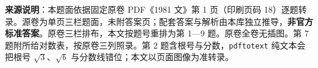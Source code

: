 


\begin{gktip}
\textbf{来源说明}：本题面依据固定原卷 PDF《1981 文》第 1 页（印刷页码 18）逐题转录。源卷为单页三栏题面，未附答案页；配套答案与解析由本库独立推导，\textbf{非官方标准答案}。原卷三栏排布，本文按题号重排为第 1—9 题。原卷全卷无插图。第 7 题附所给对数表，按原卷三列照录。第 2 题含根号与分数，\texttt{pdftotext} 纯文本会把根号 $\sqrt3$、$\sqrt b$ 与分数线错位；本文以页面图像为准转录。
\end{gktip}

\par\medskip

